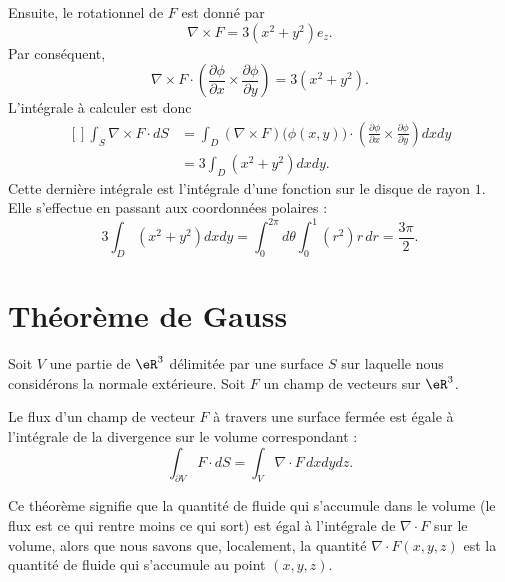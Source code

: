 \begin{example}
	Ensuite, le rotationnel de $F$ est donné par
	\begin{equation}
		\nabla\times F=3(x^2+y^2)e_z.
	\end{equation}
	Par conséquent,
	\begin{equation}
		\nabla\times F\cdot\left( \frac{ \partial \phi }{ \partial x }\times\frac{ \partial \phi }{ \partial y } \right)=3(x^2+y^2).
	\end{equation}
	L'intégrale à calculer est donc
	\begin{equation}
		\begin{aligned}[]
			\int_S\nabla\times F\cdot dS & =\int_D(\nabla\times F)\big( \phi(x,y) \big)\cdot\left( \frac{ \partial \phi }{ \partial x }\times\frac{ \partial \phi }{ \partial y } \right)dxdy \\
			                             & =3\int_D(x^2+y^2)dxdy.
		\end{aligned}
	\end{equation}
	Cette dernière intégrale est l'intégrale d'une fonction sur le disque de rayon $1$. Elle s'effectue en passant aux coordonnées polaires :
	\begin{equation}
		3\int_D(x^2+y^2)dxdy=\int_0^{2\pi}d\theta\int_0^1(r^2)r\,dr=\frac{ 3\pi }{2}.
	\end{equation}
\end{example}

\section{Théorème de Gauss}

Soit $V$ une partie de $\eR^3$ délimitée par une surface $S$ sur laquelle nous considérons la normale extérieure. Soit $F$ un champ de vecteurs sur $\eR^3$.

\begin{theorem}
	Le flux d'un champ de vecteur $F$ à travers une surface fermée est égale à l'intégrale de la divergence sur le volume correspondant :
	\begin{equation}
		\int_{\partial V} F\cdot dS=\int_V\nabla\cdot F\,dxdydz.
	\end{equation}
\end{theorem}

Ce théorème signifie que la quantité de fluide qui s'accumule dans le volume (le flux est ce qui rentre moins ce qui sort) est égal à l'intégrale de $\nabla\cdot F$ sur le volume, alors que nous savons que, localement, la quantité $\nabla\cdot F(x,y,z)$ est la quantité de fluide qui s'accumule au point $(x,y,z)$.

